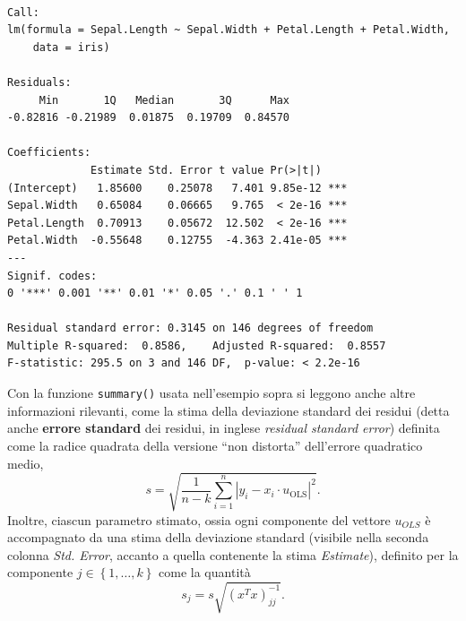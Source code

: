 \documentclass[
  italian,
  letterpaper,
]{book}
\newcommand{\cur}[1]{\left\{ #1 \right\}}
\newcommand{\ols}{\operatorname{OLS}}
\theoremstyle{definition}
\theoremstyle{remark}
\begin{document}
\begin{verbatim}

Call:
lm(formula = Sepal.Length ~ Sepal.Width + Petal.Length + Petal.Width, 
    data = iris)

Residuals:
     Min       1Q   Median       3Q      Max 
-0.82816 -0.21989  0.01875  0.19709  0.84570 

Coefficients:
             Estimate Std. Error t value Pr(>|t|)    
(Intercept)   1.85600    0.25078   7.401 9.85e-12 ***
Sepal.Width   0.65084    0.06665   9.765  < 2e-16 ***
Petal.Length  0.70913    0.05672  12.502  < 2e-16 ***
Petal.Width  -0.55648    0.12755  -4.363 2.41e-05 ***
---
Signif. codes:  
0 '***' 0.001 '**' 0.01 '*' 0.05 '.' 0.1 ' ' 1

Residual standard error: 0.3145 on 146 degrees of freedom
Multiple R-squared:  0.8586,    Adjusted R-squared:  0.8557 
F-statistic: 295.5 on 3 and 146 DF,  p-value: < 2.2e-16
\end{verbatim}

Con la funzione \texttt{summary()} usata nell'esempio sopra si leggono
anche altre informazioni rilevanti, come la stima della deviazione
standard dei residui (detta anche \textbf{errore standard} dei residui,
in inglese \emph{residual standard error}) definita come la radice
quadrata della versione ``non distorta'' dell'errore quadratico medio,
\[ s = \sqrt{ \frac{1}{n-k} \sum_{i=1}^n|y_i - x_i \cdot u_{\ols}|^2}.\]
Inoltre, ciascun parametro stimato, ossia ogni componente del vettore
\(u_{OLS}\) è accompagnato da una stima della deviazione standard
(visibile nella seconda colonna \emph{Std. Error}, accanto a quella
contenente la stima \emph{Estimate}), definito per la componente
\(j \in \cur{1, \ldots, k}\) come la quantità
\[  s_j = s \sqrt{ (x^Tx)^{-1}_{jj}}.\]
\end{document}
